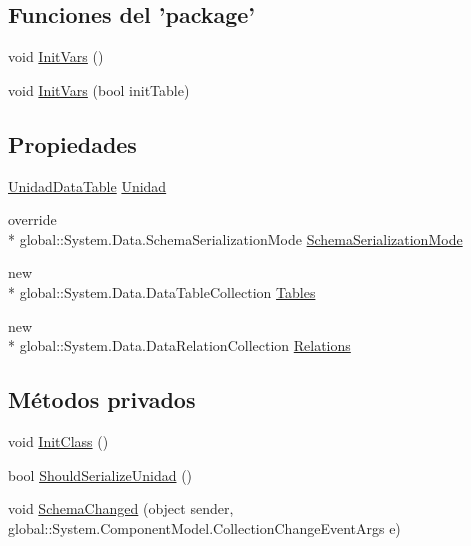 \subsection*{Funciones del 'package'}
\begin{DoxyCompactItemize}
\item 
void \hyperlink{class_proyecto___integrador__3_1_1ds_unidad_a264991defd8f2856787ed46e2f0a3881}{Init\-Vars} ()
\item 
void \hyperlink{class_proyecto___integrador__3_1_1ds_unidad_a7a2a64e67f40f263bd085984f14e3c7a}{Init\-Vars} (bool init\-Table)
\end{DoxyCompactItemize}
\subsection*{Propiedades}
\begin{DoxyCompactItemize}
\item 
\hyperlink{class_proyecto___integrador__3_1_1ds_unidad_1_1_unidad_data_table}{Unidad\-Data\-Table} \hyperlink{class_proyecto___integrador__3_1_1ds_unidad_a78a56c4320f0067f020ea95490bdf195}{Unidad}
\item 
override \\*
global\-::\-System.\-Data.\-Schema\-Serialization\-Mode \hyperlink{class_proyecto___integrador__3_1_1ds_unidad_ae681aadb8c80cfb04e19826c6608871d}{Schema\-Serialization\-Mode}
\item 
new \\*
global\-::\-System.\-Data.\-Data\-Table\-Collection \hyperlink{class_proyecto___integrador__3_1_1ds_unidad_ac3f1357f878bf8848284f29737f47276}{Tables}
\item 
new \\*
global\-::\-System.\-Data.\-Data\-Relation\-Collection \hyperlink{class_proyecto___integrador__3_1_1ds_unidad_a4341745873b49fbaa39cd3562161c504}{Relations}
\end{DoxyCompactItemize}
\subsection*{Métodos privados}
\begin{DoxyCompactItemize}
\item 
void \hyperlink{class_proyecto___integrador__3_1_1ds_unidad_a13ea02006bd9c08f3314b470de662f66}{Init\-Class} ()
\item 
bool \hyperlink{class_proyecto___integrador__3_1_1ds_unidad_a90147697e43270e586da18302ddd99ed}{Should\-Serialize\-Unidad} ()
\item 
void \hyperlink{class_proyecto___integrador__3_1_1ds_unidad_a11ade5cd6b1b18f1ee25ffc978b6575b}{Schema\-Changed} (object sender, global\-::\-System.\-Component\-Model.\-Collection\-Change\-Event\-Args e)
\end{DoxyCompactItemize}
